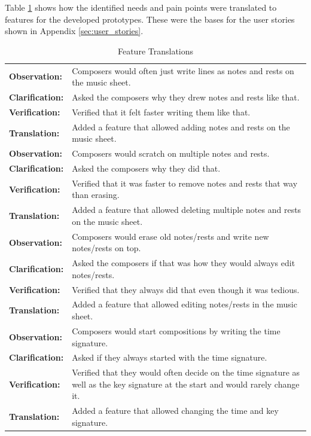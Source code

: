 		Table \ref{tab:feature-translations} shows how the identified needs and pain points were translated to features for the developed prototypes. These were the bases for the user stories shown in Appendix \ref{sec:user_stories}.

		\begin{longtable}{|p{2.5cm} p{12.5cm}|}
			\caption{Feature Translations} \label{tab:feature-translations} \\ 
		  	\hline

		  	\textbf{Observation:} 	& Composers would often just write lines as notes and rests on the music sheet. \\
		  	\textbf{Clarification:} 	& Asked the composers why they drew notes and rests like that. \\
		  	\textbf{Verification:} 	& Verified that it felt faster writing them like that. \\
		  	\textbf{Translation:} 	& Added a feature that allowed adding notes and rests on the music sheet. \\
		  	\hline

		  	\textbf{Observation:} 	& Composers would scratch on multiple notes and rests. \\
		  	\textbf{Clarification:} 	& Asked the composers why they did that. \\
		  	\textbf{Verification:} 	& Verified that it was faster to remove notes and rests that way than erasing. \\
		  	\textbf{Translation:} 	& Added a feature that allowed deleting multiple notes and rests on the music sheet. \\
		  	\hline

		  	\textbf{Observation:} 	& Composers would erase old notes/rests and write new notes/rests on top. \\
		  	\textbf{Clarification:} 	& Asked the composers if that was how they would always edit notes/rests. \\
		  	\textbf{Verification:} 	& Verified that they always did that even though it was tedious. \\
		  	\textbf{Translation:} 	& Added a feature that allowed editing notes/rests in the music sheet. \\
		  	\hline

		  	\textbf{Observation:} 	& Composers would start compositions by writing the time signature. \\
		  	\textbf{Clarification:} 	& Asked if they always started with the time signature. \\
		  	\textbf{Verification:} 	& Verified that they would often decide on the time signature as well as the key signature at the start and would rarely change it. \\
		  	\textbf{Translation:} 	& Added a feature that allowed changing the time and key signature. \\
		  	\hline


\end{longtable}
